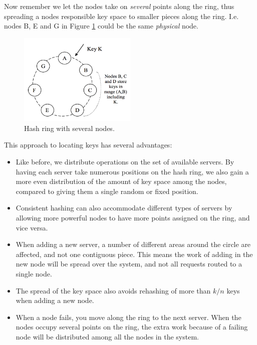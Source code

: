 Now remember we let the nodes take on \emph{several} points along the ring, thus spreading a nodes responsible key space to smaller pieces along the ring.
I.e. nodes B, E and G in Figure \ref{fig:hashring} could be the same \emph{physical} node.

\begin{figure}[h]
    \centering
    \includegraphics[width=0.5\textwidth]{background/figures/hashring}
    \caption{Hash ring with several nodes\cite{dynamo}.}
    \label{fig:hashring}
\end{figure}

This approach to locating keys has several advantages:

\begin{itemize}
\item Like before, we distribute operations on the set of available servers. By having each server take numerous positions on the hash ring, we also gain a more even distribution of the amount of key space among the nodes, compared to giving them a single random or fixed position.

\item Consistent hashing can also accommodate different types of servers by allowing more powerful nodes to have more points assigned on the ring, and vice versa. 

\item When adding a new server, a number of different areas around the circle are affected, and not one contiguous piece. This means the work of adding in the new node will be spread over the system, and not all requests routed to a single node.

\item The spread of the key space also avoids rehashing of more than $k/n$ keys when adding a new node. 

\item When a node fails, you move along the ring to the next server. When the nodes occupy several points on the ring, the extra work because of a failing node will be distributed among all the nodes in the system.
\end{itemize}

